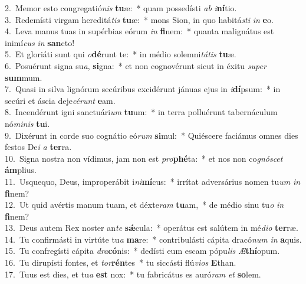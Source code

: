 {2.~}Memor esto congregatió\textit{nis} \textbf{tu}æ:~* quam possedísti \textit{ab} \textit{i}\textbf{ní}tio.\\
{3.~}Redemísti virgam hereditá\textit{tis} \textbf{tu}æ:~* mons Sion, in quo habitá\textit{sti} \textit{in} \textbf{e}o.\\
{4.~}Leva manus tuas in supérbias eórum \textit{in} \textbf{fi}nem:~* quanta malignátus est inimí\textit{cus} \textit{in} \textbf{san}cto!\\
{5.~}Et gloriáti sunt qui \textit{o}\textbf{dé}runt te:~* in médio solemni\textit{tá}\textit{tis} \textbf{tu}æ.\\
{6.~}Posuérunt signa su\textit{a}, \textbf{si}gna:~* et non cognovérunt sicut in éxitu \textit{su}\textit{per} \textbf{sum}mum.\\
{7.~}Quasi in silva lignórum secúribus excidérunt jánuas ejus in \textit{i}\textbf{dí}psum:~* in secúri et áscia deje\textit{cé}\textit{runt} \textbf{e}am.\\
{8.~}Incendérunt igni sanctuári\textit{um} \textbf{tu}um:~* in terra polluérunt tabernáculum nó\textit{mi}\textit{nis} \textbf{tu}i.\\
{9.~}Dixérunt in corde suo cognátio eó\textit{rum} \textbf{si}mul:~* Quiéscere faciámus omnes dies festos De\textit{i} \textit{a} \textbf{ter}ra.\\
{10.~}Signa nostra non vídimus, jam non est \textit{pro}\textbf{phé}ta:~* et nos non co\textit{gnó}\textit{scet} \textbf{ám}plius.\\
{11.~}Usquequo, Deus, improperábit i\textit{ni}\textbf{mí}cus:~* irrítat adversárius nomen tu\textit{um} \textit{in} \textbf{fi}nem?\\
{12.~}Ut quid avértis manum tuam, et déxte\textit{ram} \textbf{tu}am,~* de médio sinu tu\textit{o} \textit{in} \textbf{fi}nem?\\
{13.~}Deus autem Rex noster an\textit{te} \textbf{sǽ}cula:~* operátus est salútem in mé\textit{di}\textit{o} \textbf{ter}ræ.\\
{14.~}Tu confirmásti in virtúte tu\textit{a} \textbf{ma}re:~* contribulásti cápita dracó\textit{num} \textit{in} \textbf{a}quis.\\
{15.~}Tu confregísti cápita \textit{dra}\textbf{có}nis:~* dedísti eum escam pópu\textit{lis} \textit{Æ}\textbf{thí}opum.\\
{16.~}Tu dirupísti fontes, et \textit{tor}\textbf{rén}tes~* tu siccásti flú\textit{vi}\textit{os} \textbf{E}than.\\
{17.~}Tuus est dies, et tu\textit{a} \textbf{est} nox:~* tu fabricátus es auró\textit{ram} \textit{et} \textbf{so}lem.\\
